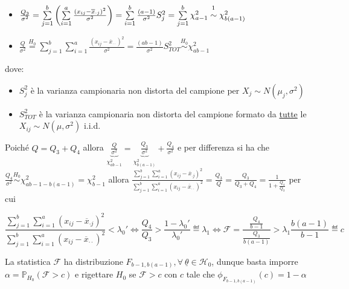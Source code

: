 \documentclass[hidelinks, 10pt]{article}
\begin{document}
\begin{itemize}
\item $ \frac{Q_{3}}{\sigma^{2}} = \sum\limits_{j = 1}^{b} \left( \sum\limits_{i = 1}^{a} \frac{(x_{ij} - \overline{x}_{\cdot j})^{2}}{\sigma^{2}} \right) = \sum\limits_{i = 1}^{b} \frac{(a - 1)}{\sigma^{2}} S_{j}^{2} = \sum\limits_{j = 1}^{b} \chi^{2}_{a  - 1} \stackrel{\footnotemark[1]}{\sim} \chi^{2}_{b(a - 1)} $
\item $ \frac{Q}{\sigma^{2}} \stackrel{H_{0}}{=} \sum\limits_{j = 1}^{b} \sum\limits_{i = 1}^{a} \frac{(x_{ij} - \overline{x}_{\cdot \cdot})^{2}}{\sigma^{2}} = \frac{(ab - 1)}{\sigma^{2}} S_{TOT}^{2} \stackrel{H_{0}}{\sim} \chi^{2}_{ab - 1} $
\end{itemize}

dove:
\begin{itemize}
\item $ S_{j}^{2} $ \`e la varianza campionaria non distorta del campione per $ X_{j} \sim N(\mu_{j}, \sigma^{2}) $
\item $ S_{TOT}^{2} $ \`e la varianza campionaria non distorta del campione formato da \underline{tutte} le $ X_{ij} \sim N(\mu, \sigma^{2}) $ i.i.d.
\end{itemize}

Poich\'e $ Q = Q_{3} + Q_{4} $ allora $ \underbrace{\frac{Q}{\sigma^{2}}}_{\chi^{2}_{ab - 1}} = \underbrace{\frac{Q_{3}}{\sigma^{2}}}_{\chi^{2}_{b(a - 1)}} + \frac{Q_{4}}{\sigma^{2}} $ e per differenza si ha che $ \frac{Q_{4}}{\sigma^{2}} \stackrel{H_{0}}{\sim} \chi^{2}_{ab - 1 - b(a - 1)} = \chi^{2}_{b - 1} $ allora $ \frac{\sum\limits_{j = 1}^{b} \sum\limits_{i = 1}^{a} (x_{ij} - \overline{x}_{\cdot j})^{2}}{\sum\limits_{j = 1}^{b} \sum\limits_{i = 1}^{a} (x_{ij} - \overline{x}_{\cdot \cdot})^{2}} = \frac{Q_{3}}{Q} = \frac{Q_{3}}{Q_{3} + Q_{4}} = \frac{1}{1 + \frac{Q_{4}}{Q_{3}}} $ per cui 

\[ \frac{\sum\limits_{j = 1}^{b} \sum\limits_{i = 1}^{a} (x_{ij} - \overline{x}_{\cdot j})^{2}}{\sum\limits_{j = 1}^{b} \sum\limits_{i = 1}^{a} (x_{ij} - \overline{x}_{\cdot \cdot})^{2}} < \lambda_{0}' \iff \frac{Q_{4}}{Q_{3}} > \frac{1 - \lambda_{0}'}{\lambda_{0}'} \eqdef \lambda_{1} \iff \mathcal{F} = \frac{\frac{Q_{4}}{b - 1}}{\frac{Q_{3}}{b(a - 1)}} > \lambda_{1} \frac{b(a - 1)}{b - 1} \eqdef c \]

La statistica $ \mathcal{F} $ ha distribuzione $ F_{b - 1, b(a - 1)}, \forall\ \underline{\theta} \in \mathcal{H}_{0} $, dunque basta imporre $ \alpha = \mathbb{P}_{H_{0}} (\mathcal{F} > c) $ e rigettare $ H_{0} $ se $ \mathcal{F} > c $ con $ c $ tale che $ \phi_{F_{b - 1, b(a - 1)}} (c) = 1 - \alpha $
\end{document}
